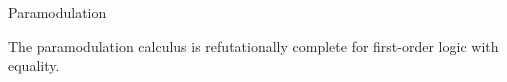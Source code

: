 \begin{entry}{Paramodulation}
\begin{history}
\end{history}

\begin{technicalities}
The paramodulation calculus is refutationally complete for
first-order logic with equality.
\end{technicalities}



%
%
%
%
%
%
% 
%












\end{entry}
